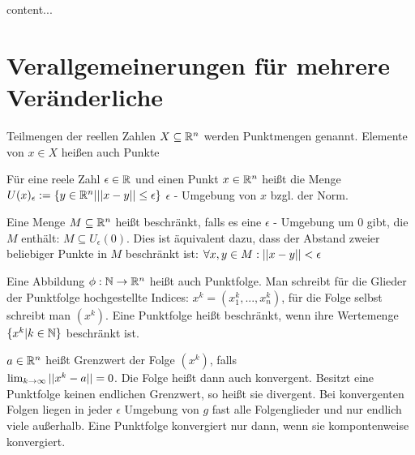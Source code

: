 \begin{definition}
	content...
\end{definition}

\pagebreak

\section{Verallgemeinerungen für mehrere Veränderliche}

\begin{definition}[Punktmenge]
	Teilmengen der reellen Zahlen $X \subseteq \mathbb{R}^n$ werden Punktmengen genannt. Elemente von $x \in X$ heißen auch Punkte

	Für eine reele Zahl $\epsilon \in \mathbb{R}$ und einen Punkt $x \in \mathbb{R}^n$ heißt die Menge $U(x)_\epsilon := \{ y \in \mathbb{R}^n | ||x - y|| \leq \epsilon \}$ $\epsilon$ - Umgebung von $x$ bzgl. der Norm.
\end{definition}

\begin{definition}[Beschränktheit]
	Eine Menge $M \subseteq \mathbb{R}^n$ heißt beschränkt, falls es eine $\epsilon$ - Umgebung um $0$ gibt, die $M$ enthält: $M \subseteq U_\epsilon(0)$. Dies ist äquivalent dazu, dass der Abstand zweier beliebiger Punkte in $M$ beschränkt ist: $\forall x,y \in M : ||x - y|| < \epsilon$
\end{definition}

\begin{definition}[Punktfolge]
	Eine Abbildung $\phi : \mathbb{N} \rightarrow \mathbb{R}^n$ heißt auch Punktfolge. Man schreibt für die Glieder der Punktfolge hochgestellte Indices: $x^k = (x_1^k, ..., x_n^k)$, für die Folge selbst schreibt man $(x^k)$. Eine Punktfolge heißt beschränkt, wenn ihre Wertemenge $\{ x^k | k \in \mathbb{N} \}$ beschränkt ist.
\end{definition}


\begin{definition}[Grenzwerte]
	$a \in \mathbb{R}^n$ heißt Grenzwert der Folge $(x^k)$, falls \\ $\lim_{k \rightarrow \infty} ||x^k - a|| = 0$. Die Folge heißt dann auch konvergent. Besitzt eine Punktfolge keinen endlichen Grenzwert, so heißt sie divergent.
	Bei konvergenten Folgen liegen in jeder $\epsilon$ Umgebung von $g$ fast alle Folgenglieder und nur endlich viele außerhalb. Eine Punktfolge konvergiert nur dann, wenn sie kompontenweise konvergiert.
\end{definition}

